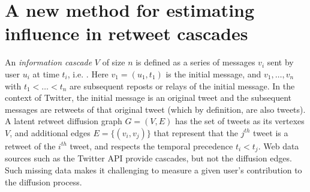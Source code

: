 \documentclass[a4paper,12pt]{article}
\newcommand{\rev}[1]{{\color{navy}{#1}}}
\begin{document}
\section*{A new method for estimating influence in retweet cascades}
\label{sec:user-influence}

An {\em information cascade} $V$ of size $n$ is defined as a series of messages $v_i$ sent by user $u_i$ at time $t_i$, i.e. \rev{$V=\{v_i\}_{i=1:n}$, $v_i=(u_i, t_i)$}.
Here $v_1 = (u_1, t_1)$ is the initial message, and $v_1, \ldots, v_n$ with $t_1<\ldots<t_n$ are subsequent reposts or relays of the initial message.
In the context of Twitter, the initial message is an original tweet and the subsequent messages are retweets of that original tweet (which by definition, are also tweets).
A latent retweet diffusion graph $G=(V,E)$ has the set of tweets as its vertexes $V$, and additional edges $E=\{(v_i, v_j)\}$ that represent that the $j^{th}$ tweet is a retweet of the $i^{th}$ tweet, and respects the temporal precedence $t_i<t_j$.
Web data sources such as the Twitter API provide cascades, but not the
diffusion edges. 
Such missing data makes it challenging to measure a given user's contribution to the diffusion process.
\end{document}
